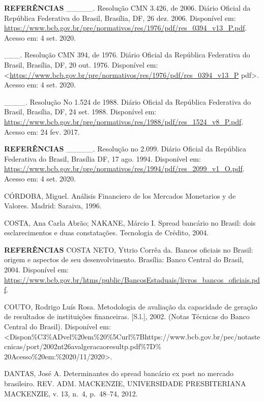 \documentclass[
  ignorenonframetext,
  aspectratio=169,
  ignorenonframetext]{beamer}
\begin{document}
\begin{frame}{\textbf{REFERÊNCIAS}}
\protect\hypertarget{referuxeancias-9}{}
\_\_\_\_\_. Resolução CMN 3.426, de 2006. Diário Oficial da República
Federativa do Brasil, Brasília, DF, 26 dez. 2006. Disponível em:
\url{https://www.bcb.gov.br/pre/normativos/res/1976/pdf/res_0394_v13_P.pdf}.
Acesso em: 4 set. 2020.

\_\_\_. Resolução CMN 394, de 1976. Diário Oficial da República
Federativa do Brasil, Brasília, DF, 20 out. 1976. Disponível em:
\textless{}\url{https://www.bcb.gov.br/pre/normativos/res/1976/pdf/res_0394_v13_P}
pdf\textgreater. Acesso em: 4 set. 2020.

\_\_\_\_. Resolução No 1.524 de 1988. Diário Oficial da República
Federativa do Brasil, Brasília, DF, 24 set. 1988. Disponível em:
\url{https://www.bcb.gov.br/pre/normativos/res/1988/pdf/res_1524_v8_P.pdf}.
Acesso em: 24 fev. 2017.
\end{frame}

\begin{frame}{\textbf{REFERÊNCIAS}}
\protect\hypertarget{referuxeancias-10}{}
\_\_\_\_\_. Resolução no 2.099. Diário Oficial da República Federativa
do Brasil, Brasília DF, 17 ago. 1994. Disponível em:
\url{https://www.bcb.gov.br/pre/normativos/res/1994/pdf/res_2099_v1_O.pdf}.
Acesso em: 4 set. 2020.

CÓRDOBA, Miguel. Análisis Financiero de los Mercados Monetarios y de
Valores. Madrid: Saraiva, 1996.

COSTA, Ana Carla Abrão; NAKANE, Márcio I. Spread bancário no Brasil:
dois esclarecimentos e duas constatações. Tecnologia de Crédito, 2004.
\end{frame}

\begin{frame}{\textbf{REFERÊNCIAS}}
\protect\hypertarget{referuxeancias-11}{}
COSTA NETO, Yttrio Corrêa da. Bancos oficiais no Brasil: origem e
aspectos de seu desenvolvimento. Brasília: Banco Central do Brasil,
2004. Disponível em:
\url{https://www.bcb.gov.br/htms/public/BancosEstaduais/livros_bancos_oficiais.pdf}.

COUTO, Rodrigo Luís Rosa. Metodologia de avaliação da capacidade de
geração de resultados de instituições financeiras. {[}S.l.{]}, 2002.
(Notas Técnicas do Banco Central do Brasil). Disponível em:
\textless Dispon\%C3\%ADvel\%20em\%20\%5Curl\%7Bhttps://www.bcb.gov.br/pec/notastecnicas/port/2002nt26avalgeracaoresultp.pdf\%7D\%
20Acesso\%20em:\%2020/11/2020\textgreater.

DANTAS, José A. Determinantes do spread bancário ex post no mercado
brasileiro. REV. ADM. MACKENZIE, UNIVERSIDADE PRESBITERIANA MACKENZIE,
v. 13, n.~4, p.~48--74, 2012.
\end{frame}
\end{document}
